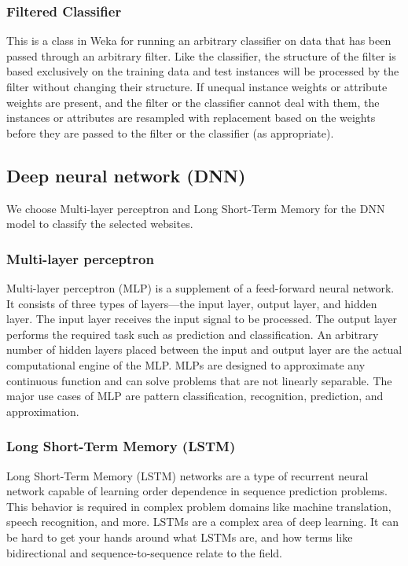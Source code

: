 \documentclass[conference]{IEEEtran}
\begin{document}
\subsubsection{Filtered Classifier} This is a class in Weka for running an arbitrary classifier on data that has been passed through an arbitrary filter. Like the classifier, the structure of the filter is based exclusively on the training data and test instances will be processed by the filter without changing their structure. If unequal instance weights or attribute weights are present, and the filter or the classifier cannot deal with them, the instances or attributes are resampled with replacement based on the weights before they are passed to the filter or the classifier (as appropriate). 

\subsection{Deep neural network (DNN)}
We choose Multi-layer perceptron and Long Short-Term Memory for the DNN model to classify the selected websites.

\subsubsection{Multi-layer perceptron} Multi-layer perceptron (MLP) is a supplement of a feed-forward neural network. It consists of three types of layers—the input layer, output layer, and hidden layer. The input layer receives the input signal to be processed. The output layer performs the required task such as prediction and classification. An arbitrary number of hidden layers placed between the input and output layer are the actual computational engine of the MLP. \cite{b13} MLPs are designed to approximate any continuous function and can solve problems that are not linearly separable. The major use cases of MLP are pattern classification, recognition, prediction, and approximation.

\subsubsection{Long Short-Term Memory (LSTM)} Long Short-Term Memory (LSTM) networks are a type of recurrent neural network capable of learning order dependence in sequence prediction problems. \cite{b14} This behavior is required in complex problem domains like machine translation, speech recognition, and more. LSTMs are a complex area of deep learning. It can be hard to get your hands around what LSTMs are, and how terms like bidirectional and sequence-to-sequence relate to the field.
\end{document}
